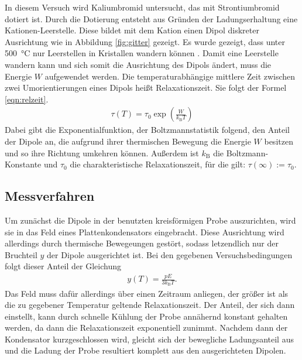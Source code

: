 In diesem Versuch wird Kaliumbromid untersucht, das mit Strontiumbromid dotiert ist. Durch die Dotierung entsteht aus Gründen der Ladungserhaltung eine Kationen-Leerstelle. Diese bildet mit dem Kation einen Dipol diskreter Ausrichtung wie in Abbildung \ref{fig:gitter} gezeigt. Es wurde gezeigt, dass unter \SI{500}{\celsius} nur Leerstellen in Kristallen wandern können \cite{wjost}. Damit eine Leerstelle wandern kann und sich somit die Ausrichtung des Dipols ändert, muss die Energie $W$ aufgewendet werden. Die temperaturabhängige mittlere Zeit zwischen zwei Umorientierungen eines Dipols heißt Relaxationszeit. Sie folgt der Formel \eqref{eqn:relzeit}.
\begin{align}
  \tau(T) = \tau_0 \exp\left(\frac{W}{k_\text{B} T}\right) \label{eqn:relzeit}
\end{align}
Dabei gibt die Exponentialfunktion, der Boltzmannstatistik folgend, den Anteil der Dipole an, die aufgrund ihrer thermischen Bewegung die Energie $W$ besitzen und so ihre Richtung umkehren können.
Außerdem ist $k_\text{B}$ die Boltzmann-Konstante und $\tau_0$ die charakteristische Relaxationszeit, für die gilt: $\tau(\infty) := \tau_0$.

\subsection{Messverfahren}

Um zunächst die Dipole in der benutzten kreisförmigen Probe auszurichten, wird sie in das Feld eines Plattenkondensators eingebracht. Diese Ausrichtung wird allerdings durch thermische Bewegeungen gestört, sodass letzendlich nur der Bruchteil $y$ der Dipole ausgerichtet ist. Bei den gegebenen Versuchsbedingungen folgt dieser Anteil der Gleichung
\begin{align}
  y(T) = \frac{pE}{3k_\text{B}T}.
\end{align}
Das Feld muss dafür allerdings über einen Zeitraum anliegen, der größer ist als die zu gegebener Temperatur geltende Relaxationszeit.
Der Anteil, der sich dann einstellt, kann durch schnelle Kühlung der Probe annähernd konstant gehalten werden, da dann die Relaxationszeit exponentiell zunimmt. Nachdem dann der Kondensator kurzgeschlossen wird, gleicht sich der bewegliche Ladungsanteil aus und die Ladung der Probe resultiert komplett aus den ausgerichteten Dipolen.


